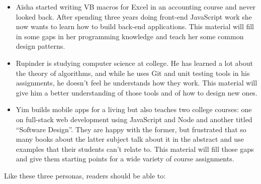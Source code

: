 \documentclass[krantzl]{krantz}
\begin{document}
\begin{itemize}

\item 

Aïsha started writing VB macros for Excel in an accounting course and never looked back.
    After spending three years doing front-end JavaScript work
    she now wants to learn how to build back-end applications.
    This material will fill in some gaps in her programming knowledge
    and teach her some common design patterns.



\item 

Rupinder is studying computer science at college.
    He has learned a lot about the theory of algorithms,
    and while he uses Git and unit testing tools in his assignments,
    he doesn’t feel he understands how they work.
    This material will give him a better understanding of those tools
    and of how to design new ones.



\item 

Yim builds mobile apps for a living
    but also teaches two college courses:
    one on full-stack web development using JavaScript and Node
    and another titled “Software Design”.
    They are happy with the former,
    but frustrated that so many books about the latter subject talk about it in the abstract
    and use examples that their students can’t relate to.
    This material will fill those gaps
    and give them starting points for a wide variety of course assignments.



\end{itemize}


Like these three personas, readers should be able to:
\end{document}
